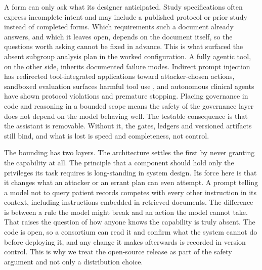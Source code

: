 \documentclass[preprint,5p, 10pt, times]{elsarticle}
\begin{document}
A form can only ask what its designer anticipated.
Study specifications often express incomplete intent and may include a published protocol or prior study instead of completed forms.
Which requirements such a document already answers, and which it leaves open, depends on the document itself, so the questions worth asking cannot be fixed in advance.
This is what surfaced the absent subgroup analysis plan in the worked configuration.
%
A fully agentic tool, on the other side, inherits documented failure modes. Indirect prompt injection has redirected tool-integrated applications toward attacker-chosen actions\cite{greshake2023not}, sandboxed evaluation surfaces harmful tool use \cite{ruan2024identifying,debenedetti2024agentdojo}, and autonomous clinical agents have shown protocol violations and premature stopping\cite{ashraf2026medcta}.
%
Placing governance in code and reasoning in a bounded scope means the safety of the governance layer does not depend on the model behaving well. The testable consequence is that the assistant is removable. Without it, the gates, ledgers and versioned artifacts still bind, and what is lost is speed and completeness, not control.

The bounding has two layers. 
%
The architecture settles the first by never granting the capability at all. The principle that a component should hold only the privileges its task requires is long-standing in system design.
Its force here is that it changes what an attacker or an errant plan can even attempt.
%
A prompt telling a model not to query patient records competes with every other instruction in its context, including instructions embedded in retrieved documents. 
The difference is between a rule the model might break and an action the model cannot take.
That raises the question of how anyone knows the capability is truly absent. The code is open, so a consortium can read it and confirm what the system cannot do before deploying it, and any change it makes afterwards is recorded in version control. This is why we treat the open-source release as part of the safety argument and not only a distribution choice.
\end{document}
